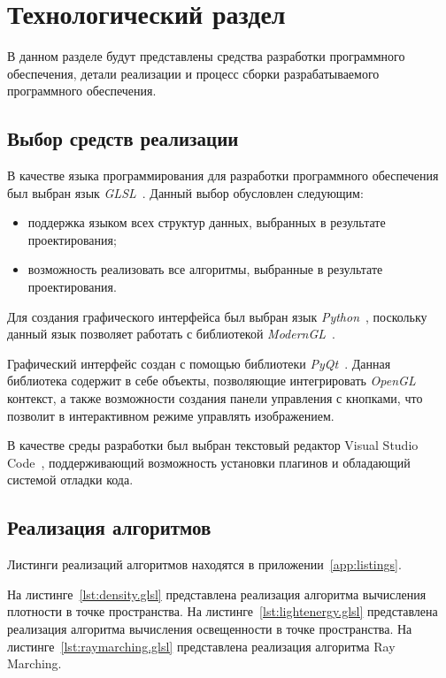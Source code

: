 \chapter{Технологический раздел}

В данном разделе будут представлены средства разработки программного обеспечения, детали реализации и процесс сборки разрабатываемого программного обеспечения.

\section{Выбор средств реализации}

В качестве языка программирования для разработки программного обеспечения был выбран язык \textit{GLSL}~\cite{glsl}. Данный выбор обусловлен следующим:
\begin{itemize}
	\item поддержка языком всех структур данных, выбранных в результате проектирования;
	\item возможность реализовать все алгоритмы, выбранные в результате проектирования.
\end{itemize}


Для создания графического интерфейса был выбран язык \textit{Python}~\cite{python}, поскольку данный язык позволяет работать с библиотекой \textit{ModernGL}~\cite{moderngl}.
 
Графический интерфейс создан с помощью библиотеки \textit{PyQt}~\cite{pyqt}. Данная библиотека содержит в себе объекты, позволяющие интегрировать \textit{OpenGL} контекст, а также возможности создания панели управления с кнопками, что позволит в интерактивном режиме управлять изображением.

В качестве среды разработки был выбран текстовый редактор Visual Studio Code~\cite{vsc}, поддерживающий возможность установки плагинов и обладающий системой отладки кода.


\section{Реализация алгоритмов}

Листинги реализаций алгоритмов находятся в приложении~\ref{app:listings}.

На листинге~\ref{lst:density.glsl} представлена реализация алгоритма вычисления плотности в точке пространства. На листинге~\ref{lst:lightenergy.glsl} представлена реализация алгоритма вычисления освещенности в точке пространства. На листинге~\ref{lst:raymarching.glsl} представлена реализация алгоритма Ray Marching.


